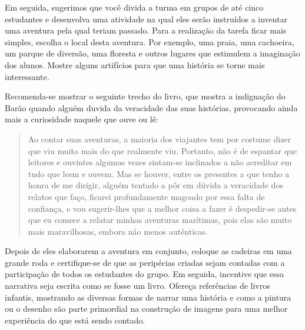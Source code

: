 \documentclass[11pt]{extarticle}
\begin{document}
Em seguida, sugerimos que você divida a turma em grupos de até cinco estudantes e desenvolva uma atividade na qual eles serão instruídos a inventar uma aventura pela qual teriam passado. Para a realização da tarefa ficar mais simples, escolha o local desta aventura. Por exemplo, uma praia, uma cachoeira, um parque de diversão, uma floresta e outros lugares que estimulem a imaginação dos alunos. Mostre alguns artifícios para que uma história se torne mais interessante. 


Recomenda-se mostrar o seguinte trecho do livro, que mostra a indignação do Barão quando alguém duvida da veracidade das suas histórias, provocando ainda mais a curiosidade naquele que ouve ou lê:

\begin{quote}

Ao contar suas aventuras, a maioria dos viajantes tem por costume dizer que viu muito mais do que realmente viu. Portanto, não é de espantar que leitores e ouvintes algumas vezes sintam-se inclinados a não acreditar em tudo que leem e ouvem. Mas se houver, entre os presentes a que tenho a honra de me dirigir, alguém tentado a pôr em dúvida a veracidade dos relatos que faço, ficarei profundamente magoado por essa falta de confiança, e vou sugerir-lhes que a melhor coisa a fazer é despedir-se antes que eu comece a relatar minhas aventuras marítimas, pois elas são muito mais maravilhosas, embora não menos autênticas.

\end{quote}

Depois de eles elaborarem a aventura em conjunto, coloque as cadeiras em uma grande roda e certifique-se de que as peripécias criadas sejam contadas com a participação de todos os estudantes do grupo. Em seguida, incentive que essa narrativa seja escrita como se fosse um livro. Ofereça referências de livros infantis, mostrando as diversas formas de narrar uma história e como a pintura ou o desenho são parte primordial na construção de imagens para uma melhor experiência do que está sendo contado. 

\end{document}
